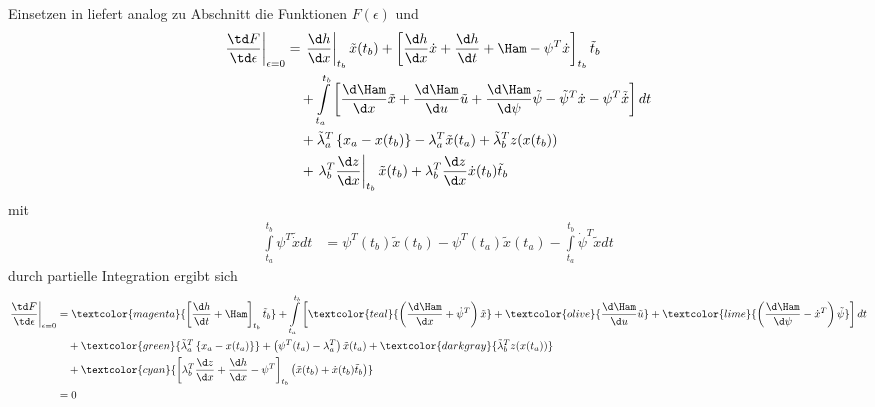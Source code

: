 Einsetzen in  liefert analog zu Abschnitt  die Funktionen $F(\epsilon)$ und
\begin{align*}
	\left.\frac{\td F}{\td \epsilon}\right|_{\epsilon=0} & = \left.\frac{\d h}{\d x}\right|_{t_b}\tilde{x}(t_b) + \left[\frac{\d h}{\d x}\dot{x} +
	\frac{\d h}{\d t}+\Ham - \psi^T\dot{x} \right]_{t_b}\tilde{t}_b\\ 
	& \quad + \int\limits_{t_a}^{t_b}\left[\frac{\d\Ham}{\d
	x}\tilde{x}+\frac{\d\Ham}{\d u}\tilde{u}+\frac{\d\Ham}{\d\psi}\tilde{\psi} - \tilde{\psi}^T\dot{x} - \psi^T\tilde{\dot{x}}\right]dt \\
	& \quad + \tilde{\lambda}_a^T\left\{x_a-x(t_b) \right\} - \lambda_a^T\tilde{x}(t_a)+\tilde{\lambda}_b^T z(x(t_b)) \\
	& \quad + \left.\lambda_b^T\frac{\d z}{\d x}\right|_{t_b}\tilde{x}(t_b)+\lambda_b^T\frac{\d z}{\d x}\dot{x}(t_b)\tilde{t}_b
\end{align*}
mit 
\begin{align*}
	\int\limits_{t_a}^{t_b}\psi^T\tilde{\dot{x}}dt & = \psi^T(t_b)\tilde{x}(t_b)-\psi^T(t_a)\tilde{x}(t_a)-\int\limits_{t_a}^{t_b}\dot{\psi}^T\tilde{x}dt
\end{align*} 
durch partielle Integration ergibt sich
\begin{align*}
\left.\frac{\td F}{\td \epsilon}\right|_{\epsilon=0} & = \textcolor{magenta}{\left[\frac{\d h}{\d t}+\Ham \right]_{t_b}\tilde{t}_b} + \int\limits_{t_a}^{t_b}\left[
\textcolor{teal}{\left(\frac{\d\Ham}{\d x}+\dot{\psi}^T \right)\tilde{x}} + \textcolor{olive}{\frac{\d\Ham}{\d u}\tilde{u}} +
\textcolor{lime}{\left(\frac{\d\Ham}{\d\psi}-\dot{x}^T \right)\tilde{\psi}} \right]dt\\
& \quad + \textcolor{green}{\tilde{\lambda}_a^T\left\{x_a - x(t_a) \right\}} + \left(\psi^T(t_a) - \lambda_a^T \right)\tilde{x}(t_a) +
\textcolor{darkgray}{\tilde{\lambda}_b^Tz(x(t_a))} \\
& \quad + \textcolor{cyan}{ \left[\lambda_b^T\frac{\d z}{\d x}+\frac{\d h}{\d x}-\psi^T \right]_{t_b}\left(\tilde{x}(t_b)+\dot{x}(t_b)\tilde{t}_b \right)}\\
& = 0
\end{align*}

